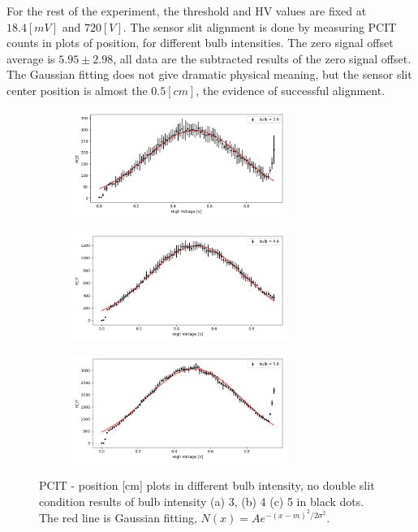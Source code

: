 \documentclass{article}
\begin{document}
For the rest of the experiment, the threshold and HV values are fixed at $18.4 [mV]$ and $720 [V]$.
The sensor slit alignment is done by measuring PCIT counts in plots of position, for different bulb intensities.
The zero signal offset average is $5.95 \pm 2.98$, all data are the subtracted results of the zero signal offset.
The Gaussian fitting does not give dramatic physical meaning, but the sensor slit center position is almost the $0.5 [cm]$, the evidence of successful alignment.
\begin{figure}[H]
  \centering
  \begin{subfigure}[b]{7cm}
      \centering
      \includegraphics[width=7cm]{../results/sensor_slit_position_(3).png}
      \caption{}
  \end{subfigure}
  \hfill
  \begin{subfigure}[b]{7cm}
    \centering
    \includegraphics[width=7cm]{../results/sensor_slit_position_(4).png}
    \caption{}
\end{subfigure}
\centering
\hfill
\begin{subfigure}[b]{7cm}
  \centering
  \includegraphics[width=7cm]{../results/sensor_slit_position_(5).png}
  \caption{}
\end{subfigure}
\hfill
  \caption{PCIT - position [cm] plots in different bulb intensity, no double slit condition results of bulb intensity (a) 3, (b) 4 (c) 5  in black dots.
    The red line is Gaussian fitting, $N(x) = A e^{-(x-m)^2/2\sigma^2}$.
  }
  \label{fig: sensor_slit_position}
\end{figure}
\end{document}
